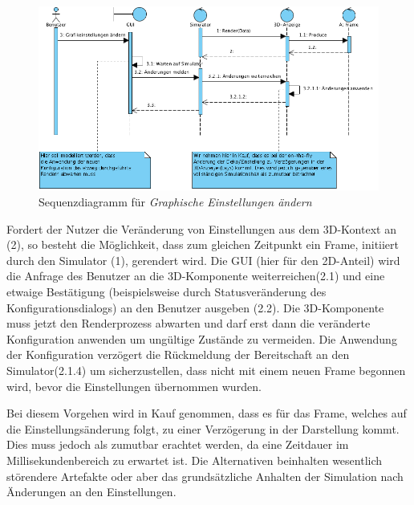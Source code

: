 \begin{figure}
\includegraphics[width=16cm]{bilder/change_graphic_config}
\caption{Sequenzdiagramm für \textit{Graphische Einstellungen ändern}}
\label{labelname}
\end{figure}
Fordert der Nutzer die Veränderung von Einstellungen aus dem 3D-Kontext an (2), so besteht die Möglichkeit, dass zum gleichen Zeitpunkt ein Frame, initiiert durch den Simulator (1), gerendert wird. 
Die GUI (hier für den 2D-Anteil) wird die Anfrage des Benutzer an die 3D-Komponente weiterreichen(2.1) und eine etwaige Bestätigung (beispielsweise durch Statusveränderung des Konfigurationsdialogs) an den 
Benutzer ausgeben (2.2). Die 3D-Komponente muss jetzt den Renderprozess abwarten und darf erst dann die veränderte Konfiguration anwenden um ungültige Zustände zu vermeiden. Die Anwendung der Konfiguration verzögert 
die Rückmeldung der Bereitschaft an den Simulator(2.1.4) um sicherzustellen, dass nicht mit einem neuen Frame begonnen wird, bevor die Einstellungen übernommen wurden. 

Bei diesem Vorgehen wird in Kauf genommen, dass es für das Frame, welches auf die Einstellungsänderung folgt, zu einer Verzögerung in der Darstellung kommt. Dies muss jedoch als zumutbar erachtet werden, da eine Zeitdauer im Millisekundenbereich zu erwartet ist. Die Alternativen beinhalten wesentlich störendere Artefakte oder aber das grundsätzliche Anhalten der Simulation nach Änderungen an den Einstellungen.

